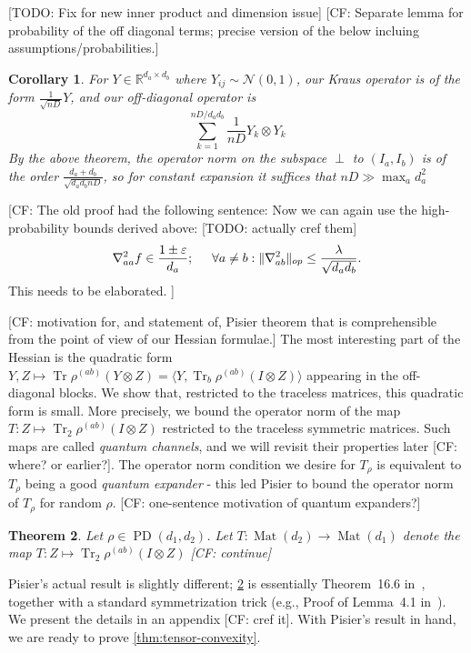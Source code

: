 \documentclass{article}
\newtheorem{theorem}{Theorem}
\newtheorem{corollary}[theorem]{Corollary}
\newcommand{\R}{{\mathbb{R}}}
\newcommand{\ot}{\otimes}
\newcommand{\mat}{\operatorname{Mat}}
\newcommand\eps{\varepsilon}
\newcommand\PD{\operatorname{PD}}
\newcommand\tr{\operatorname{Tr}}
\newcommand{\CF}[1]{{\color{purple}[CF: #1]}}
\newcommand{\TODO}[1]{{\color{blue}[TODO: #1]}}
\begin{document}
\TODO{Fix for new inner product and dimension issue}
\CF{Separate lemma for probability of the off diagonal terms; precise version of the below incluing assumptions/probabilities.}
\begin{corollary}
For $Y \in \R^{d_{a} \times d_{b}}$ where $Y_{ij} \sim \mathcal{N}(0,1)$, our Kraus operator is of the form $\frac{1}{\sqrt{nD}} Y$, and our off-diagonal operator is
\[ \sum_{k=1}^{nD/d_{a}d_{b}} \frac{1}{nD} Y_{k} \otimes Y_{k}   \]
By the above theorem, the operator norm on the subspace $\perp$ to $(I_{a},I_{b})$ is of the order $\frac{d_{a}+d_{b}}{\sqrt{d_{a} d_{b} nD}}$, so for constant expansion it suffices that $nD \gg \max_{a} d_{a}^{2}$
\end{corollary}

\CF{The old proof had the following sentence: 
Now we can again use the high-probability bounds derived above: \TODO{actually cref them}
\begin{align}\nabla^{2}_{aa} f \in \frac{1 \pm \eps}{d_{a}}; \hspace{5mm} \forall a \neq b: \|\nabla^{2}_{ab}\|_{op} \leq \frac{\lambda}{\sqrt{d_{a} d_{b}}}. \label{eq:expansion-thing}  \end{align}
This needs to be elaborated.
}

\CF{motivation for, and statement of, Pisier theorem that is comprehensible from the point of view of our Hessian formulae.}
The most interesting part of the Hessian is the quadratic form $Y,Z \mapsto \tr \rho^{(ab)} \left( Y \ot Z \right) = \langle Y, \tr_b \rho^{(ab)} \left(I \ot Z\right) \rangle$ appearing in the off-diagonal blocks. We show that, restricted to the traceless matrices, this quadratic form is small. More precisely, we bound the operator norm of the map $T: Z \mapsto \tr_2 \rho^{(ab)} \left(I \ot Z\right)$ restricted to the traceless symmetric matrices. Such maps are called \emph{quantum channels}, and we will revisit their properties later \CF{where? or earlier?}. The operator norm condition we desire for $T_{\rho}$ is equivalent to $T_{\rho}$ being a good \emph{quantum expander} - this led Pisier to bound the operator norm of $T_{\rho}$ for random $\rho$. \CF{one-sentence motivation of quantum expanders?}

\begin{theorem}\label{thm:hess-pisier} Let $\rho \in \PD(d_1,d_2)$. Let $T:\mat(d_2) \to \mat(d_1)$ denote the map $T:Z \mapsto \tr_2 \rho^{(ab)} \left(I \ot Z\right)$ \CF{continue}
\end{theorem}
Pisier's actual result is slightly different; \cref{thm:hess-pisier} is essentially Theorem~16.6 in~\cite{pisier2012grothendieck}, together with a standard symmetrization trick (e.g., Proof of Lemma~4.1 in~\cite{P14}). We present the details in an appendix \CF{cref it}. With Pisier's result in hand, we are ready to prove \cref{thm:tensor-convexity}.
\end{document}
